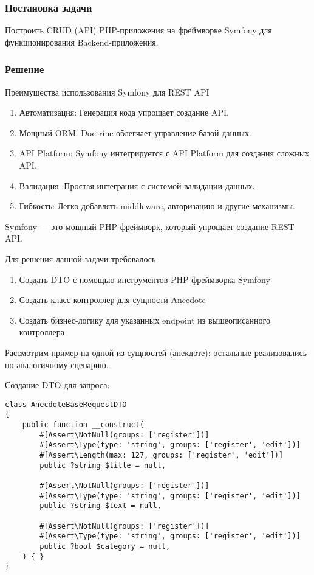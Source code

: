 \documentclass[pract]{SCWorks}
\begin{document}
\subsubsection{Постановка задачи}
Построить CRUD (API) PHP-приложения на фреймворке Symfony для функционирования
Backend-приложения. 
\subsubsection{Решение}

Преимущества использования Symfony для REST API
\begin{enumerate}
    \item Автоматизация: Генерация кода упрощает создание API.
    \item Мощный ORM: Doctrine облегчает управление базой данных.
    \item API Platform: Symfony интегрируется с API Platform для создания сложных API.
    \item Валидация: Простая интеграция с системой валидации данных.
    \item Гибкость: Легко добавлять middleware, авторизацию и другие механизмы.
\end{enumerate}

Symfony — это мощный PHP-фреймворк, который упрощает создание REST API.

Для решения данной задачи требовалось:

\begin{enumerate}
    \item Создать DTO с помощью инструментов PHP-фреймворка Symfony
    \item Создать класс-контроллер для сущности Anecdote
    \item Создать бизнес-логику для указанных endpoint из вышеописанного
    контроллера
\end{enumerate}

Рассмотрим пример на одной из сущностей (анекдоте): остальные реализовались по
аналогичному сценарию.

Создание DTO для запроса:

\begin{verbatim}
class AnecdoteBaseRequestDTO
{
    public function __construct(
        #[Assert\NotNull(groups: ['register'])]
        #[Assert\Type(type: 'string', groups: ['register', 'edit'])]
        #[Assert\Length(max: 127, groups: ['register', 'edit'])]
        public ?string $title = null,

        #[Assert\NotNull(groups: ['register'])]
        #[Assert\Type(type: 'string', groups: ['register', 'edit'])]
        public ?string $text = null,

        #[Assert\NotNull(groups: ['register'])]
        #[Assert\Type(type: 'string', groups: ['register', 'edit'])]
        public ?bool $category = null,
    ) { }
}
\end{verbatim}
\end{document}
